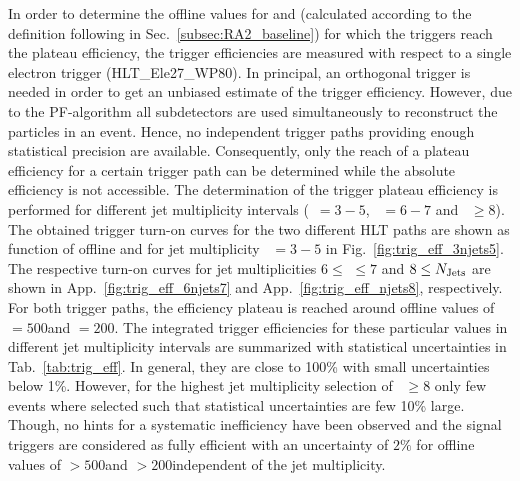 In order to determine the offline values for \HT and \MHT (calculated according to the definition following in Sec.~\ref{subsec:RA2_baseline}) for which the triggers reach the plateau efficiency, the trigger efficiencies are measured with respect to a single electron trigger (HLT\_Ele27\_WP80). In principal, an orthogonal trigger is needed in order to get an unbiased estimate of the trigger efficiency. However, due to the PF-algorithm all subdetectors are used simultaneously to reconstruct the particles in an event. Hence, no independent trigger paths providing enough statistical precision are available. Consequently, only the reach of a plateau efficiency for a certain trigger path can be determined while the absolute efficiency is not accessible. The determination of the trigger plateau efficiency is performed for different jet multiplicity intervals (\NJets~$ = 3-5$, \NJets~$ = 6-7$ and \NJets~$ \ge 8$). The obtained trigger turn-on curves for the two different HLT paths are shown as function of offline \HT and \MHT for jet multiplicity \NJets~$ = 3-5$ in Fig.~\ref{fig:trig_eff_3njets5}. The respective turn-on curves for jet multiplicities $6 \leq$ \NJets $\leq 7$ and $8 \leq N_{\text{Jets}}$ are shown in App.~\ref{fig:trig_eff_6njets7} and App.~\ref{fig:trig_eff_njets8}, respectively. For both trigger paths, the efficiency plateau is reached around offline values of \HT$ = 500$\gev and \MHT$ = 200$\gev. The integrated trigger efficiencies for these particular values in different jet multiplicity intervals are summarized with statistical uncertainties in Tab.~\ref{tab:trig_eff}. In general, they are close to 100\% with small uncertainties below 1\%. However, for the highest jet multiplicity selection of \NJets~$ \ge 8$ only few events where selected such that statistical uncertainties are few 10\% large. Though, no hints for a systematic inefficiency have been observed and the signal triggers are considered as fully efficient with an uncertainty of $2\%$ for offline values of \HT$ > 500$\gev and \MHT$ > 200$\gev independent of the jet multiplicity. \\


